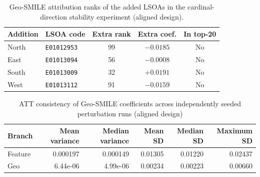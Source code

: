 
\begin{table}[H]
\centering
\caption{ATT stability at $N=4{,}000$ (seed 42) under one-LSOA additions in the four cardinal directions (aligned design).}
\label{tab:hull_att_stability_aligned}
\scriptsize
{}
\end{table}

\begin{table}[H]
\centering
\caption{Geo-SMILE attribution ranks of the added LSOAs in the cardinal-direction stability experiment (aligned design).}
\label{tab:hull_att_stability_extra_aligned}
\small
\begin{tabular}{llccc}
\toprule
Addition & LSOA code & Extra rank & Extra coef. & In top-20 \\
\midrule
North & \texttt{E01012953} & 99 & $-0.0185$ & No \\
East & \texttt{E01013094} & 56 & $-0.0008$ & No \\
South & \texttt{E01013009} & 32 & $+0.0191$ & No \\
West & \texttt{E01013112} & 91 & $-0.0159$ & No \\
\bottomrule
\end{tabular}
\end{table}


\begin{table}[H]
\centering
\caption{ATT consistency of Geo-SMILE coefficients across independently seeded perturbation runs (aligned design)}
\label{tab:hull_consistency_variance_aligned}
\small
\begin{tabular}{l|rrrrr}
\toprule
Branch & Mean variance & Median variance & Mean SD & Median SD & Maximum SD \\
\midrule
Feature & 0.000197 & 0.000149 & 0.01305 & 0.01220 & 0.02437 \\
Geo & 6.44e-06 & 4.99e-06 & 0.00234 & 0.00223 & 0.00660 \\
\bottomrule
\end{tabular}
\end{table}

